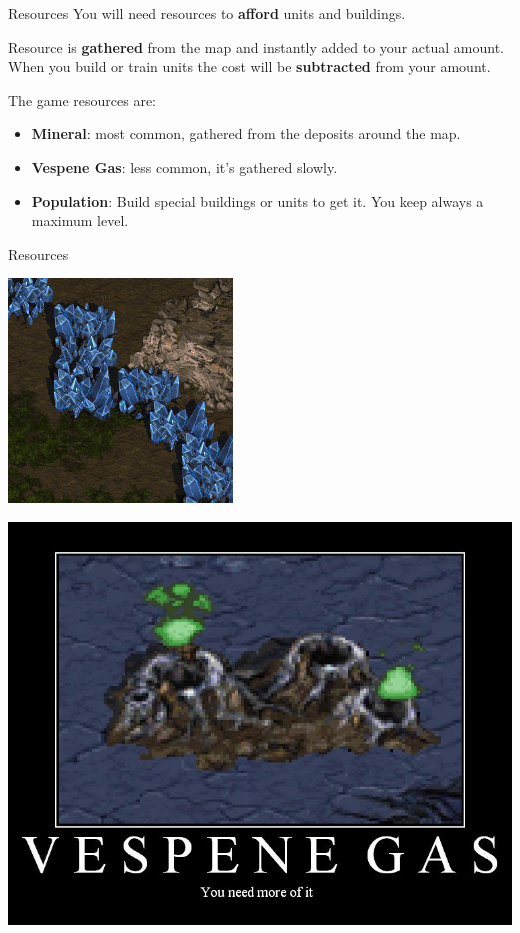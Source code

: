 \documentclass[10pt]{beamer}
\begin{document}
\begin{frame}{Resources}
    You will need resources to \textbf{afford} units and buildings.\newline

 Resource is \textbf{gathered} from the map and instantly added to your actual amount. When you build or train units the cost will be \textbf{subtracted} from your amount.\newline

    The game resources are:
    \begin{itemize}
     \item \textbf{Mineral}: most common, gathered from the deposits around the map.
     \item \textbf{Vespene Gas}: less common, it's gathered slowly.
     \item \textbf{Population}: Build special buildings or units to get it. You keep always a maximum level.
    \end{itemize}
\end{frame}

\begin{frame}{Resources}
\begin{center}
	  \includegraphics[scale=0.5]{min.jpg}
\end{center}
\begin{center}
	  \includegraphics[scale=0.2]{ves.jpg}
\end{center}
\end{frame}
\end{document}
